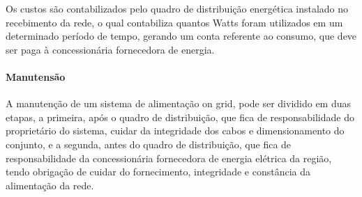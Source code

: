     Os custos são contabilizados pelo quadro de distribuição energética instalado no recebimento da rede, o qual contabiliza quantos Watts foram utilizados em um determinado período de tempo, gerando um conta referente ao consumo, que deve ser paga à concessionária fornecedora de energia.

  \paragraph{Manutensão}
  A manutenção de um sistema de alimentação on grid, pode ser dividido em duas etapas, a primeira, após o quadro de distribuição, que fica de responsabilidade do proprietário do sistema, cuidar da integridade dos cabos e dimensionamento do conjunto, e a segunda, antes do quadro de distribuição, que fica de responsabilidade da concessionária fornecedora de energia elétrica da região, tendo obrigação de cuidar do fornecimento, integridade e constância da alimentação da rede.

